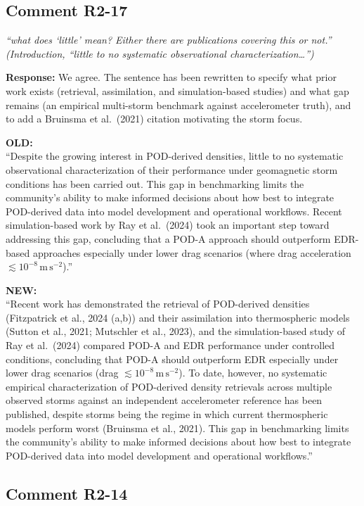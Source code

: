 \documentclass[11pt]{article}
\newcommand{\reviewercomment}[1]{%
  \medskip
  \noindent\textit{\color{reviewblue}#1}%
  \medskip
}
\newcommand{\oldtext}[1]{%
  \smallskip
  \noindent\hspace{1em}\begin{minipage}{0.92\textwidth}%
  \color{quotegray}\textbf{OLD:}\\[2pt]``#1''%
  \end{minipage}%
  \smallskip
}
\newcommand{\newtext}[1]{%
  \smallskip
  \noindent\hspace{1em}\begin{minipage}{0.92\textwidth}%
  \color{quotegreen}\textbf{NEW:}\\[2pt]``#1''%
  \end{minipage}%
  \smallskip
}
\begin{document}
\subsection{Comment R2-17}

\reviewercomment{%
``what does `little' mean? Either there are publications covering this
or not.'' (Introduction, ``little to no systematic observational
characterization\ldots'')}

\textbf{Response:}
We agree. The sentence has been rewritten to specify what prior work
exists (retrieval, assimilation, and simulation-based studies) and
what gap remains (an empirical multi-storm benchmark against
accelerometer truth), and to add a Bruinsma et al.\ (2021) citation
motivating the storm focus.

\oldtext{Despite the growing interest in POD-derived densities, little to no systematic observational characterization of their performance under geomagnetic storm conditions has been carried out. This gap in benchmarking limits the community's ability to make informed decisions about how best to integrate POD-derived data into model development and operational workflows. Recent simulation-based work by Ray et al.\ (2024) took an important step toward addressing this gap, concluding that a POD-A approach should outperform EDR-based approaches especially under lower drag scenarios (where drag acceleration $\lesssim 10^{-8}\,\mathrm{m\,s^{-2}}$).}

\newtext{Recent work has demonstrated the retrieval of POD-derived densities (Fitzpatrick et al., 2024 (a,b)) and their assimilation into thermospheric models (Sutton et al., 2021; Mutschler et al., 2023), and the simulation-based study of Ray et al.\ (2024) compared POD-A and EDR performance under controlled conditions, concluding that POD-A should outperform EDR especially under lower drag scenarios (drag $\lesssim 10^{-8}\,\mathrm{m\,s^{-2}}$). To date, however, no systematic empirical characterization of POD-derived density retrievals across multiple observed storms against an independent accelerometer reference has been published, despite storms being the regime in which current thermospheric models perform worst (Bruinsma et al., 2021). This gap in benchmarking limits the community's ability to make informed decisions about how best to integrate POD-derived data into model development and operational workflows.}


\subsection{Comment R2-14}
\end{document}
